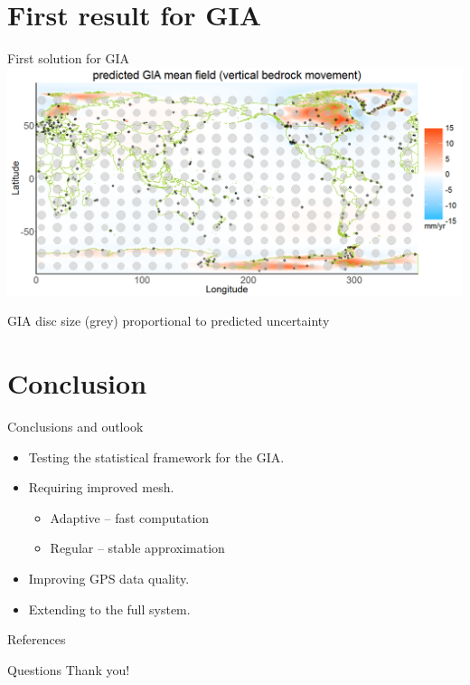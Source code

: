 \documentclass{beamer}
\begin{document}
\section{First result for GIA}
\begin{frame}{First solution for GIA}
\vspace{0.5cm}
\includegraphics[width = 1.05\textwidth]{images/GIA_map}

\centering
\footnotesize{GIA disc size (grey) proportional to predicted uncertainty}
\end{frame}

\section{Conclusion}
\begin{frame}{Conclusions and outlook}

\begin{itemize}
\item Testing the statistical framework for the GIA.
\item Requiring improved mesh.
\begin{itemize}
\item Adaptive -- fast computation
\item Regular -- stable approximation
\end{itemize}
\item Improving GPS data quality.
\item Extending to the full system.
\end{itemize}


\end{frame}

\begin{frame}{References}

\small{}
\end{frame}


\begin{frame}{Questions}
\centering
\Huge
Thank you!
\end{frame}
\end{document}
